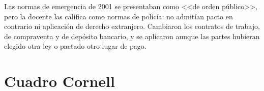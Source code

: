 \documentclass[12pt,oneside]{book}
\begin{document}

\begin{important}
Las normas de emergencia de 2001 se presentaban como <<de orden p\'ublico>>, pero la docente las califica como normas de polic\'ia: no admit\'ian pacto en contrario ni aplicaci\'on de derecho extranjero. Cambiaron los contratos de trabajo, de compraventa y de dep\'osito bancario, y se aplicaron aunque las partes hubieran elegido otra ley o pactado otro lugar de pago.
\end{important}

\section{Cuadro Cornell}
\end{document}

